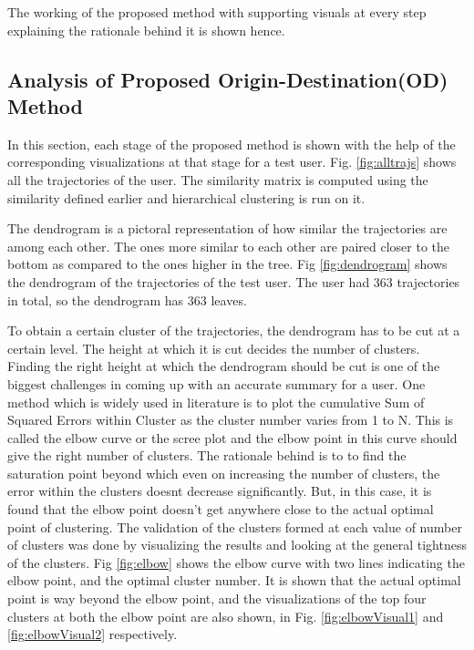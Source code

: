 The working of the proposed method with supporting visuals at every step explaining the rationale behind it is shown hence. 

\subsection{Analysis of Proposed Origin-Destination(OD) Method}
In this section, each stage of the proposed method is shown with the help of the corresponding visualizations at that stage for a test user. 
Fig. \ref{fig:alltrajs} shows all the trajectories of the user. The similarity matrix is computed using the similarity defined earlier  and hierarchical clustering is run on it. 

The dendrogram is a pictoral representation of how similar the trajectories are among each other. The ones more similar to each other are paired closer to the bottom as compared to the ones higher in the tree. Fig \ref{fig:dendrogram} shows the dendrogram of the trajectories of the test user. The user had 363 trajectories in total, so the dendrogram has 363 leaves. 


To obtain a certain cluster of the trajectories, the dendrogram has to be cut at a certain level. The height at which it is cut decides the number of clusters. Finding the right height at which the dendrogram should be cut is one of the biggest challenges in coming up with an accurate summary for a user. One method which is widely used in literature is to plot the cumulative Sum of Squared Errors within Cluster as the cluster number varies from 1 to N. This is called the elbow curve or the scree plot and the elbow point in this curve should give the right number of clusters. The rationale behind is to to find the saturation point beyond which even on increasing the number of clusters, the error within the clusters doesnt decrease significantly. But, in this case, it is found that the elbow point doesn't get anywhere close to the actual optimal point of clustering. The validation of the clusters formed at each value of number of clusters was done by visualizing the results and looking at the general tightness of the clusters. Fig \ref{fig:elbow} shows the elbow curve with two lines indicating the elbow point, and the optimal cluster number. It is shown that the actual optimal point is way beyond the elbow point, and the visualizations of the top four clusters at both the elbow point are also shown, in Fig. \ref{fig:elbowVisual1} and \ref{fig:elbowVisual2} respectively.



